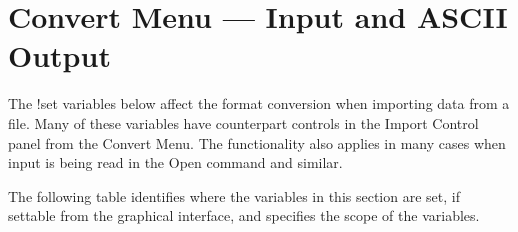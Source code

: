\section{Convert Menu --- Input and ASCII Output}

The {\cb !set} variables below affect the format conversion when
importing data from a file.  Many of these variables have counterpart
controls in the {\cb Import Control} panel from the {\cb Convert
Menu}.  The functionality also applies in many cases when input is
being read in the {\cb Open} command and similar.

The following table identifies where the variables in this section are
set, if settable from the graphical interface, and specifies the scope
of the variables.

